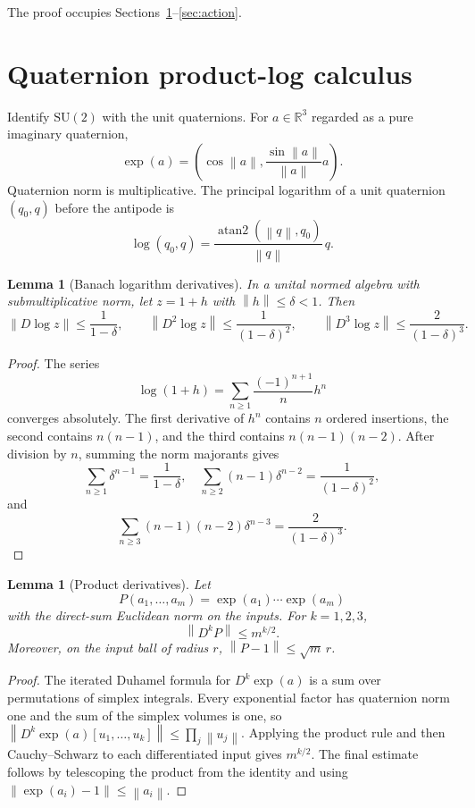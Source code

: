 \documentclass[11pt]{article}
\newtheorem{lemma}[theorem]{Lemma}
\theoremstyle{definition}
\newcommand{\SU}{\mathrm{SU}(2)}
\newcommand{\R}{\mathbb{R}}
\newcommand{\norm}[1]{\left\lVert #1\right\rVert}
\begin{document}
The proof occupies Sections~\ref{sec:quaternion}--\ref{sec:action}.

\section{Quaternion product-log calculus}\label{sec:quaternion}

Identify $\SU$ with the unit quaternions.  For $a\in\R^3$ regarded as a pure
imaginary quaternion,
\[
 \exp(a)=\left(\cos\norm a,\frac{\sin\norm a}{\norm a}a\right).
\]
Quaternion norm is multiplicative.  The principal logarithm of a unit
quaternion $(q_0,q)$ before the antipode is
\[
 \log(q_0,q)=\frac{\operatorname{atan2}(\norm q,q_0)}{\norm q}\,q.
\]

\begin{lemma}[Banach logarithm derivatives]\label{lem:log}
In a unital normed algebra with submultiplicative norm, let $z=1+h$ with
$\norm h\le\delta<1$.  Then
\begin{equation}\label{eq:logbounds}
 \norm{D\log z}\le\frac1{1-\delta},\qquad
 \norm{D^2\log z}\le\frac1{(1-\delta)^2},\qquad
 \norm{D^3\log z}\le\frac2{(1-\delta)^3}.
\end{equation}
\end{lemma}

\begin{proof}
The series
\[
 \log(1+h)=\sum_{n\ge1}\frac{(-1)^{n+1}}n h^n
\]
converges absolutely.  The first derivative of $h^n$ contains $n$ ordered
insertions, the second contains $n(n-1)$, and the third contains
$n(n-1)(n-2)$.  After division by $n$, summing the norm majorants gives
\[
 \sum_{n\ge1}\delta^{n-1}=\frac1{1-\delta},\quad
 \sum_{n\ge2}(n-1)\delta^{n-2}=\frac1{(1-\delta)^2},
\]
and
\[
 \sum_{n\ge3}(n-1)(n-2)\delta^{n-3}=\frac2{(1-\delta)^3}.
\]
\end{proof}

\begin{lemma}[Product derivatives]\label{lem:product}
Let
\[
 P(a_1,\ldots,a_m)=\exp(a_1)\cdots\exp(a_m)
\]
with the direct-sum Euclidean norm on the inputs.  For $k=1,2,3$,
\begin{equation}\label{eq:productderivatives}
 \norm{D^kP}\le m^{k/2}.
\end{equation}
Moreover, on the input ball of radius $r$,
$\norm{P-1}\le\sqrt m\,r$.
\end{lemma}

\begin{proof}
The iterated Duhamel formula for $D^k\exp(a)$ is a sum over permutations of
simplex integrals.  Every exponential factor has quaternion norm one and the
sum of the simplex volumes is one, so
$\norm{D^k\exp(a)[u_1,\ldots,u_k]}\le\prod_j\norm{u_j}$.
Applying the product rule and then Cauchy--Schwarz to each differentiated
input gives $m^{k/2}$.  The final estimate follows by telescoping the product
from the identity and using
$\norm{\exp(a_i)-1}\le\norm{a_i}$.
\end{proof}
\end{document}

